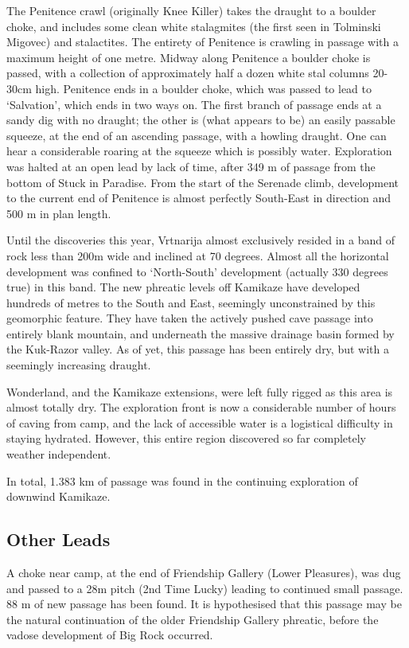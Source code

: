 The Penitence crawl (originally Knee Killer) takes the draught to a
boulder choke, and includes some clean white stalagmites (the first seen
in Tolminski Migovec) and stalactites. The entirety of Penitence is
crawling in passage with a maximum height of one metre. Midway along
Penitence a boulder choke is passed, with a collection of approximately
half a dozen white stal columns 20-30cm high. Penitence ends in a
boulder choke, which was passed to lead to `Salvation', which ends in
two ways on. The first branch of passage ends at a sandy dig with no
draught; the other is (what appears to be) an easily passable squeeze,
at the end of an ascending passage, with a howling draught. One can hear
a considerable roaring at the squeeze which is possibly water.
Exploration was halted at an open lead by lack of time, after 349 m of
passage from the bottom of Stuck in Paradise. From the start of the
Serenade climb, development to the current end of Penitence is almost
perfectly South-East in direction and 500 m in plan length.

Until the discoveries this year, Vrtnarija almost exclusively resided in
a band of rock less than 200m wide and inclined at 70 degrees. Almost
all the horizontal development was confined to `North-South' development
(actually 330 degrees true) in this band. The new phreatic levels off
Kamikaze have developed hundreds of metres to the South and East,
seemingly unconstrained by this geomorphic feature. They have taken the
actively pushed cave passage into entirely blank mountain, and
underneath the massive drainage basin formed by the Kuk-Razor valley. As
of yet, this passage has been entirely dry, but with a seemingly
increasing draught.

Wonderland, and the Kamikaze extensions, were left fully rigged as this
area is almost totally dry. The exploration front is now a considerable
number of hours of caving from camp, and the lack of accessible water is
a logistical difficulty in staying hydrated. However, this entire region
discovered so far completely weather independent.

In total, 1.383 km of passage was found in the continuing exploration of
downwind Kamikaze.

\subsection{Other Leads}

A choke near camp, at the end of Friendship Gallery (Lower Pleasures),
was dug and passed to a 28m pitch (2nd Time Lucky) leading to continued
small passage. 88 m of new passage has been found. It is hypothesised
that this passage may be the natural continuation of the older
Friendship Gallery phreatic, before the vadose development of Big Rock
occurred.

